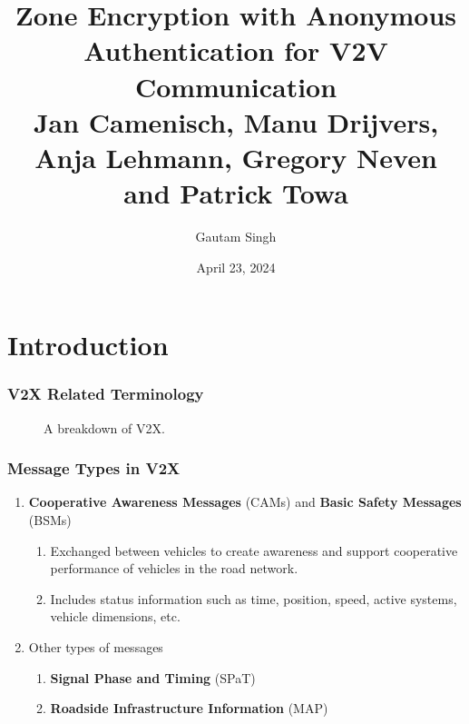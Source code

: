 \documentclass{beamer}
\title[ZE-V2V]{Zone Encryption with Anonymous Authentication for V2V Communication \\
\small Jan Camenisch, Manu Drijvers, Anja Lehmann, Gregory Neven and Patrick Towa}
\date{April 23, 2024}
\author{Gautam Singh}
\institute[]{Indian Institute of Technology Hyderabad}
\begin{document}
    \maketitle
    \tableofcontents
    \section{Introduction}
    
    \begin{frame}
        \frametitle{V2X Related Terminology}
        \begin{figure}
            \centering
            \resizebox{.8\textwidth}{!}{}
            \caption{A breakdown of V2X.}
        \end{figure}
    \end{frame}

    \begin{frame}
        \frametitle{Message Types in V2X}
        \begin{enumerate}
            \item \textbf{Cooperative Awareness Messages} (CAMs)
            \cite{etsi-en-302-637} and \textbf{Basic Safety Messages} (BSMs)
            \begin{enumerate}
                \item Exchanged between vehicles to create awareness and support
                cooperative performance of vehicles in the road network.
                \item Includes status information such as time, position, speed,
                active systems, vehicle dimensions, etc.
            \end{enumerate}
            \pause
            \item Other types of messages
            \begin{enumerate}
                \item \textbf{Signal Phase and Timing} (SPaT)
                \item \textbf{Roadside Infrastructure Information} (MAP)
            \end{enumerate} 
        \end{enumerate}
    \end{frame}
\end{document}
